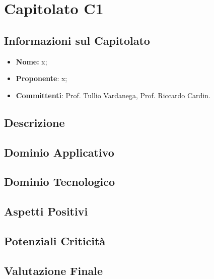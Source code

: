 \section{Capitolato C1}
\subsection{Informazioni sul Capitolato}
\begin{itemize}
	\item \textbf{Nome:} x;
	\item \textbf{Proponente}: x;
	\item \textbf{Committenti}: Prof. Tullio Vardanega, Prof. Riccardo Cardin.
\end{itemize}

\subsection{Descrizione}

\subsection{Dominio Applicativo}

\subsection{Dominio Tecnologico}


\subsection{Aspetti Positivi}

\subsection{Potenziali Criticità}

\subsection{Valutazione Finale}

